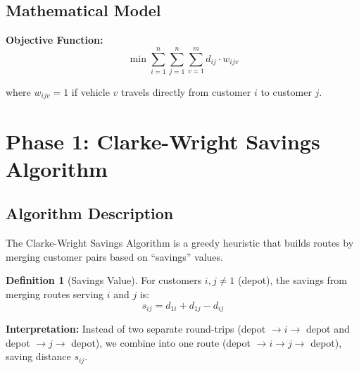 \documentclass[12pt,a4paper]{article}
\theoremstyle{definition}
\newtheorem{definition}{Definition}[section]
\begin{document}
\subsection{Mathematical Model}

\textbf{Objective Function:}
\begin{equation}
\min \sum_{i=1}^{n} \sum_{j=1}^{n} \sum_{v=1}^{m} d_{ij} \cdot w_{ijv}
\end{equation}

where $w_{ijv} = 1$ if vehicle $v$ travels directly from customer $i$ to customer $j$.

\section{Phase 1: Clarke-Wright Savings Algorithm}

\subsection{Algorithm Description}

The Clarke-Wright Savings Algorithm is a greedy heuristic that builds routes by merging customer pairs based on ``savings'' values.

\begin{definition}[Savings Value]
For customers $i, j \neq 1$ (depot), the savings from merging routes serving $i$ and $j$ is:
\begin{equation}
s_{ij} = d_{1i} + d_{1j} - d_{ij}
\end{equation}
\end{definition}

\textbf{Interpretation:} Instead of two separate round-trips (depot $\to i \to$ depot and depot $\to j \to$ depot), we combine into one route (depot $\to i \to j \to$ depot), saving distance $s_{ij}$.
\end{document}

